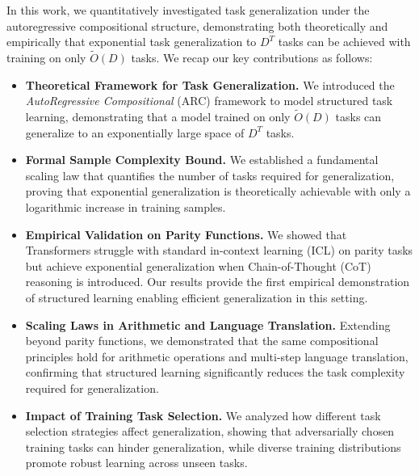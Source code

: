 


In this work, we quantitatively investigated task generalization under the autoregressive compositional structure, demonstrating both theoretically and empirically that exponential task generalization to $D^T$ tasks can be achieved with training on only $\tilde{O}(D)$ tasks. %
We recap our key contributions  as follows:
\begin{itemize}
    \item \textbf{Theoretical Framework for Task Generalization.} We introduced the \emph{AutoRegressive Compositional} (ARC) framework to model structured task learning, demonstrating that a model trained on only $\tilde{O}(D)$ tasks can generalize to an exponentially large space of $D^T$ tasks.
    
    \item \textbf{Formal Sample Complexity Bound.} We established a fundamental scaling law that quantifies the number of tasks required for generalization, proving that exponential generalization is theoretically achievable with only a logarithmic increase in training samples.
    
    \item \textbf{Empirical Validation on Parity Functions.} We showed that Transformers struggle with standard in-context learning (ICL) on parity tasks but achieve exponential generalization when Chain-of-Thought (CoT) reasoning is introduced. Our results provide the first empirical demonstration of structured learning enabling efficient generalization in this setting.
    
    \item \textbf{Scaling Laws in Arithmetic and Language Translation.} Extending beyond parity functions, we demonstrated that the same compositional principles hold for arithmetic operations and multi-step language translation, confirming that structured learning significantly reduces the task complexity required for generalization.
    
    \item \textbf{Impact of Training Task Selection.} We analyzed how different task selection strategies affect generalization, showing that adversarially chosen training tasks can hinder generalization, while diverse training distributions promote robust learning across unseen tasks.
\end{itemize}



